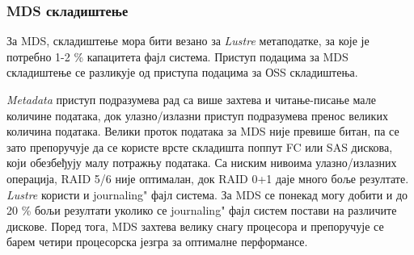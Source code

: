 \subsubsection{MDS складиштење}
За MDS, складиштење мора бити везано за \textit{Lustre} метаподатке, за које је потребно 1-2 \% капацитета фајл система. Приступ подацима за MDS складиштење се разликује од приступа подацима за ОSS складиштења. 

\textit{Metadata} приступ подразумева рад са више захтева и читање-писање мале количине података, док улазно/излазни приступ подразумева пренос великих количина података. Велики проток података за MDS није превише битан, па се зато препоручује да се користе врсте складишта поппут FC или SAS дискова, који обезбеђују малу потражњу података. Са ниским нивоима улазно/излазних операција, RAID 5/6 није оптималан, док RAID 0+1 даје много боље резултате. \textit{Lustre} користи и \zn journaling" фајл система. За MDS се понекад могу добити и до 20 \%  бољи резултати уколико се  \zn journaling" фајл систем постави на различите дискове. Поред тога, MDS захтева велику снагу процесора и препоручује се барем четири процесорска језгра за оптималне перформансе.



